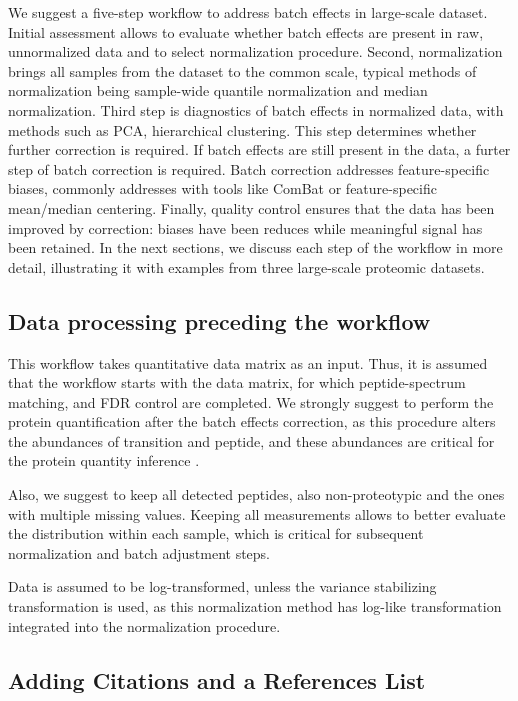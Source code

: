 \documentclass[num-refs]{wiley-article}
\begin{document}
We suggest a five-step workflow to address batch effects in large-scale dataset. Initial assessment allows to evaluate whether batch effects are present in raw, unnormalized data and to select normalization procedure. Second, normalization brings all samples from the dataset to the common scale, typical methods of normalization being sample-wide quantile normalization and median normalization. Third step is diagnostics of batch effects in normalized data, with methods such as PCA, hierarchical clustering. This step determines whether further correction is required. If batch effects are still present in the data, a furter step of batch correction is required. Batch correction addresses feature-specific biases, commonly addresses with tools like ComBat \cite{Johnson:2007aa} or feature-specific mean/median centering. Finally, quality control ensures that the data has been improved by correction: biases have been reduces while meaningful signal has been retained. In the next sections, we discuss each step of the workflow in more detail, illustrating it with examples from three large-scale proteomic datasets.

\subsection{Data processing preceding the workflow} 
This workflow takes quantitative data matrix as an input. Thus, it is assumed that the workflow starts with the data matrix, for which peptide-spectrum matching, and FDR control are completed. We strongly suggest to perform the protein quantification after the batch effects correction, as this procedure alters the abundances of transition and peptide, and these abundances are critical for the protein quantity inference \cite{Clough:2012aa, Teo:2015aa}.  

Also, we suggest to keep all detected peptides, also non-proteotypic and the ones with multiple missing values. Keeping all measurements allows to better evaluate the distribution within each sample, which is critical for subsequent normalization and batch adjustment steps.

Data is assumed to be log-transformed, unless the variance stabilizing transformation \cite{Durbin2002} is used, as this normalization method has log-like transformation integrated into the normalization procedure.

\subsection{Adding Citations and a References List}
\end{document}
